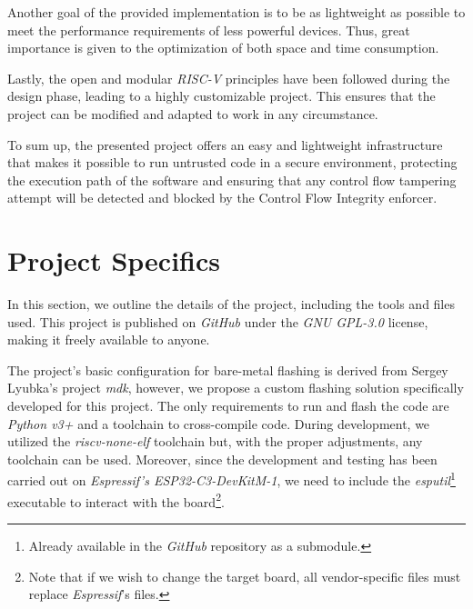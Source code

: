 Another goal of the provided implementation is to be as lightweight as possible
to meet the performance requirements of less powerful devices. Thus, great
importance is given to the optimization of both space and time consumption.

Lastly, the open and modular \textit{RISC-V} principles have been followed
during the design phase, leading to a highly customizable project. This ensures
that the project can be modified and adapted to work in any circumstance.

To sum up, the presented project offers an easy and lightweight infrastructure that
makes it possible to run untrusted code in a secure environment, protecting the
execution path of the software and ensuring that any control flow tampering
attempt will be detected and blocked by the Control Flow Integrity enforcer.

\section{Project Specifics}
\label{sec:project_specifics}

In this section, we outline the details of the project, including the tools and files
used. This project is published on \textit{GitHub}\cite{repo} under the \textit{GNU
GPL-3.0} license\cite{gpl3}, making it freely available to anyone.

The project's basic configuration for bare-metal flashing is derived from Sergey
Lyubka's project \textit{mdk}\cite{mdk}, however, we propose a custom flashing solution
specifically developed for this project. The only requirements to run and flash
the code are \textit{Python v3+} and a toolchain to cross-compile code. During
development, we utilized the \textit{riscv-none-elf}\cite{toolchain} toolchain but,
with the proper adjustments, any toolchain can be used. Moreover, since the development
and testing has been carried out on \textit{Espressif's ESP32-C3-DevKitM-1}\cite{esp32c3},
we need to include the \textit{esputil}\footnote{Already available in the
\textit{GitHub} repository as a submodule\cite{esputil}.} executable to interact
with the board\footnote{Note that if we wish to change the target board, all vendor-specific
files must replace \textit{Espressif}'s files.}.

